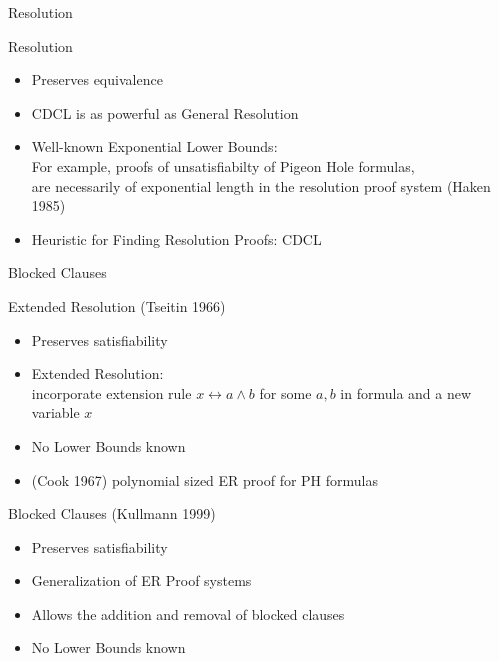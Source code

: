 \documentclass[t]{sdqbeamer}
\begin{document}
\begin{frame}{Resolution}
\begin{block}{Resolution}
\begin{itemize}\setlength{\itemsep}{1ex}
    \item Preserves equivalence
    \item CDCL is as powerful as General Resolution
    \item Well-known Exponential Lower Bounds:\\[1ex]
    For example, proofs of unsatisfiabilty of Pigeon Hole formulas,\\ 
    are necessarily of exponential length in the resolution proof system (Haken 1985)
    \item Heuristic for Finding Resolution Proofs: CDCL
\end{itemize}
\end{block}
\end{frame}


\begin{frame}{Blocked Clauses}
\begin{block}{Extended Resolution (Tseitin 1966)}
\begin{itemize}\setlength{\itemsep}{1ex}
    \item Preserves satisfiability
    \item Extended Resolution:\\
    incorporate extension rule $x \leftrightarrow a \land b$ for some $a,b$ in formula and a new variable $x$
    \item No Lower Bounds known
    \item (Cook 1967) polynomial sized ER proof for PH formulas
\end{itemize}
\end{block}
\begin{block}{Blocked Clauses (Kullmann 1999)}
\begin{itemize}\setlength{\itemsep}{1ex}
    \item Preserves satisfiability
    \item Generalization of ER Proof systems
    \item Allows the addition and removal of blocked clauses
    \item No Lower Bounds known
\end{itemize}
\end{block}
\end{frame}
\end{document}
